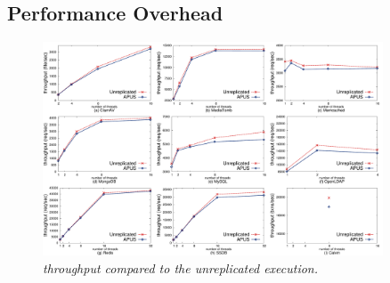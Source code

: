 % 


\subsection{Performance Overhead} \label{sec:overhead}

\begin{figure}[t]
\centering
\includegraphics[width=0.9\textwidth]{figures/throughput}
\vspace{-.10in}
\caption{\small {\em \xxx throughput compared to the unreplicated
execution.}}
\vspace{-.20in}
\label{fig:tput}
\end{figure}


